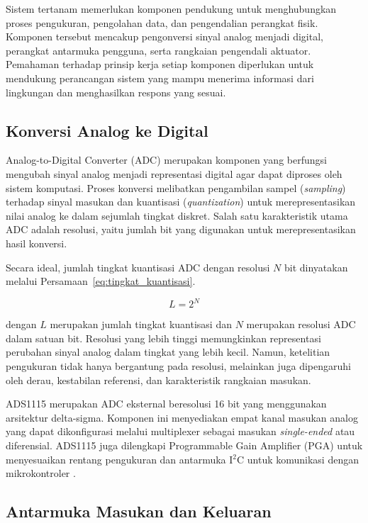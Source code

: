 Sistem tertanam memerlukan komponen pendukung untuk menghubungkan proses pengukuran, pengolahan data, dan pengendalian perangkat fisik. Komponen tersebut mencakup pengonversi sinyal analog menjadi digital, perangkat antarmuka pengguna, serta rangkaian pengendali aktuator. Pemahaman terhadap prinsip kerja setiap komponen diperlukan untuk mendukung perancangan sistem yang mampu menerima informasi dari lingkungan dan menghasilkan respons yang sesuai.

\subsection{Konversi Analog ke Digital}
\label{subsec:adc_ads1115}

Analog-to-Digital Converter (ADC) merupakan komponen yang berfungsi mengubah sinyal analog menjadi representasi digital agar dapat diproses oleh sistem komputasi. Proses konversi melibatkan pengambilan sampel (\textit{sampling}) terhadap sinyal masukan dan kuantisasi (\textit{quantization}) untuk merepresentasikan nilai analog ke dalam sejumlah tingkat diskret. Salah satu karakteristik utama ADC adalah resolusi, yaitu jumlah bit yang digunakan untuk merepresentasikan hasil konversi.

Secara ideal, jumlah tingkat kuantisasi ADC dengan resolusi $N$ bit dinyatakan melalui Persamaan~\ref{eq:tingkat_kuantisasi}.

\begin{equation}
L = 2^N
\label{eq:tingkat_kuantisasi}
\end{equation}

dengan $L$ merupakan jumlah tingkat kuantisasi dan $N$ merupakan resolusi ADC dalam satuan bit. Resolusi yang lebih tinggi memungkinkan representasi perubahan sinyal analog dalam tingkat yang lebih kecil. Namun, ketelitian pengukuran tidak hanya bergantung pada resolusi, melainkan juga dipengaruhi oleh derau, kestabilan referensi, dan karakteristik rangkaian masukan.

ADS1115 merupakan ADC eksternal beresolusi 16 bit yang menggunakan arsitektur delta-sigma. Komponen ini menyediakan empat kanal masukan analog yang dapat dikonfigurasi melalui multiplexer sebagai masukan \textit{single-ended} atau diferensial. ADS1115 juga dilengkapi Programmable Gain Amplifier (PGA) untuk menyesuaikan rentang pengukuran dan antarmuka I$^2$C untuk komunikasi dengan mikrokontroler \cite{ti_ads1115}.

\subsection{Antarmuka Masukan dan Keluaran}
\label{subsec:antarmuka_io}

